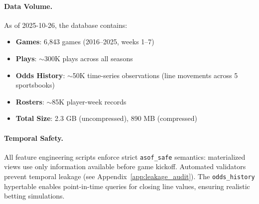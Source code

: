 \paragraph{Data Volume.}
As of 2025-10-26, the database contains:
\begin{itemize}
    \item \textbf{Games}: 6,843 games (2016--2025, weeks 1--7)
    \item \textbf{Plays}: $\sim$300K plays across all seasons
    \item \textbf{Odds History}: $\sim$50K time-series observations (line movements across 5 sportsbooks)
    \item \textbf{Rosters}: $\sim$85K player-week records
    \item \textbf{Total Size}: 2.3 GB (uncompressed), 890 MB (compressed)
\end{itemize}

\paragraph{Temporal Safety.}
All feature engineering scripts enforce strict \texttt{asof\_safe} semantics: materialized views use only information available before game kickoff. Automated validators prevent temporal leakage (see Appendix~\ref{app:leakage_audit}). The \texttt{odds\_history} hypertable enables point-in-time queries for closing line values, ensuring realistic betting simulations.
